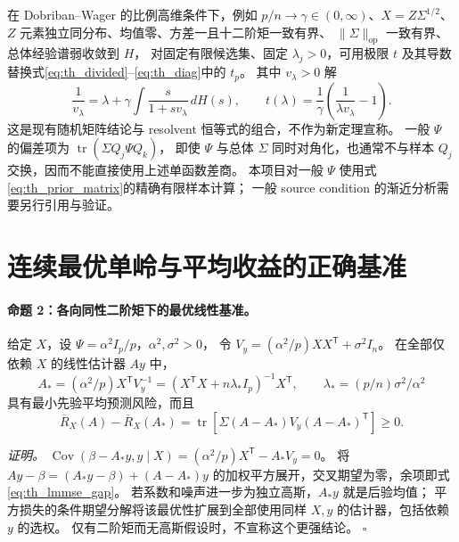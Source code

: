 \documentclass[UTF8,fontset=fandol,11pt,a4paper]{ctexart}
\begin{document}
在 Dobriban--Wager 的比例高维条件下\cite{dw}，例如
$p/n\to\gamma\in(0,\infty)$、$X=Z\Sigma^{1/2}$、$Z$ 元素独立同分布、均值零、方差一且十二阶矩一致有界、
$\lVert\Sigma\rVert_{\mathrm{op}}$ 一致有界、总体经验谱弱收敛到 $H$，
对固定有限候选集、固定 $\lambda_j>0$，可用极限 $t$ 及其导数替换式\eqref{eq:th_divided}--\eqref{eq:th_diag}中的 $t_p$。
其中 $v_\lambda>0$ 解
\begin{equation}\label{eq:th_stieltjes}
 \frac1{v_\lambda}=\lambda+\gamma\int\frac{s}{1+sv_\lambda}\,dH(s),\qquad
 t(\lambda)=\frac1\gamma\left(\frac1{\lambda v_\lambda}-1\right).
\end{equation}
这是现有随机矩阵结论与 resolvent 恒等式的组合，不作为新定理宣称。
一般 $\Psi$ 的偏差项为 $\operatorname{tr}(\Sigma Q_j\Psi Q_k)$，
即使 $\Psi$ 与总体 $\Sigma$ 同时对角化，也通常不与样本 $Q_j$ 交换，因而不能直接使用上述单函数差商。
本项目对一般 $\Psi$ 使用式\eqref{eq:th_prior_matrix}的精确有限样本计算；
一般 source condition 的渐近分析需要另行引用与验证\cite{richards,wu}。

\section{连续最优单岭与平均收益的正确基准}\label{sec:theory_bayes}
\paragraph{命题 2：各向同性二阶矩下的最优线性基准。}
给定 $X$，设 $\Psi=\alpha^2I_p/p$，$\alpha^2,\sigma^2>0$，
令 $V_y=(\alpha^2/p)XX^{\mathsf T}+\sigma^2I_n$。
在全部仅依赖 $X$ 的线性估计器 $Ay$ 中，
\begin{equation}\label{eq:th_lmmse}
 A_*=(\alpha^2/p)X^{\mathsf T}V_y^{-1}
 =(X^{\mathsf T}X+n\lambda_*I_p)^{-1}X^{\mathsf T},\qquad
 \lambda_*=(p/n)\sigma^2/\alpha^2
\end{equation}
具有最小先验平均预测风险，而且
\begin{equation}\label{eq:th_lmmse_gap}
 \overline R_X(A)-\overline R_X(A_*)
 =\operatorname{tr}\!\left[\Sigma(A-A_*)V_y(A-A_*)^{\mathsf T}\right]\ge0.
\end{equation}

\textit{证明。}
$\operatorname{Cov}(\beta-A_*y,y\mid X)=(\alpha^2/p)X^{\mathsf T}-A_*V_y=0$。
将 $Ay-\beta=(A_*y-\beta)+(A-A_*)y$ 的加权平方展开，交叉期望为零，余项即式\eqref{eq:th_lmmse_gap}。
若系数和噪声进一步为独立高斯，$A_*y$ 就是后验均值；
平方损失的条件期望分解将该最优性扩展到全部使用同样 $X,y$ 的估计器，包括依赖 $y$ 的选权。
仅有二阶矩而无高斯假设时，不宣称这个更强结论。
\hfill$\square$
\end{document}
